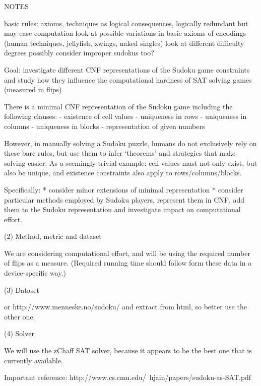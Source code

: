 \documentclass[10pt,a4paper,leqno]{article}
\begin{document}
NOTES

basic rules: axioms, techniques as logical consequences, logically redundant but may ease computation
	look at possible variations in basic axioms of
encodings (human techniques, jellyfish, xwings, naked singles)
look at different difficulty degrees
possibly consider improper sudokus too?

Goal: investigate different CNF representations of the Sudoku game constraints and study how they influence the computational hardness of SAT solving games (measured in flips)

There is a minimal CNF representation of the Sudoku game including the following clauses:
- existence of cell values
- uniqueness in rows
- uniqueness in columns
- uniqueness in blocks
- representation of given numbers

However, in manually solving a Sudoku puzzle, humans do not exclusively rely on these bare rules, but use them to infer ‘theorems’ and strategies that make solving easier.  As a seemingly trivial example: cell values must not only exist, but also be unique, and existence constraints also apply to rows/columns/blocks.

Specifically: 
* consider minor extensions of minimal representation 
* consider particular methods employed by Sudoku players, represent them in CNF, add them to the Sudoku representation and investigate impact on computational effort. 

(2) Method, metric and dataset

We are considering computational effort, and will be using the required number of flips as a measure. (Required running time should follow form these data in a device-specific way.)

(3) Dataset


or
http://www.menneske.no/sudoku/
and extract from html, so better use the other one. 

(4) Solver

We will use the zChaff SAT solver, because it appears to be the best one that is currently available. 

Important reference:
http://www.cs.cmu.edu/~hjain/papers/sudoku-as-SAT.pdf
\end{document}
